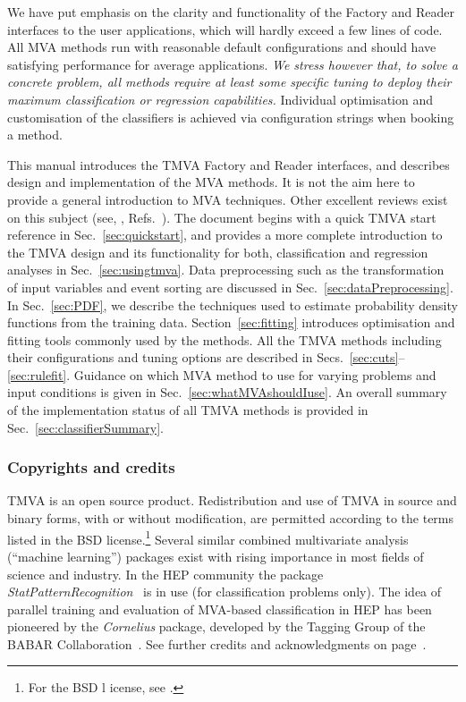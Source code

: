 We have put emphasis on the clarity and functionality of the Factory and Reader interfaces 
to the user applications, which will hardly exceed a few lines of code. All MVA methods
run with reasonable default configurations and should have satisfying performance for 
average applications. {\em We stress however that, to solve a concrete problem, all 
methods require at least some specific tuning to deploy their maximum classification or 
regression capabilities.} Individual optimisation and customisation of the classifiers is 
achieved via configuration strings when booking a method.

This manual introduces the TMVA Factory and Reader interfaces, and describes design and 
implementation of the MVA methods. It is not the aim here to provide a general introduction 
to MVA techniques. Other excellent reviews exist on this subject (see, \eg, 
Refs.~\cite{FriedmanBook,WebbBook,KunchevaBook}). The document begins with a quick TMVA 
start reference in Sec.~\ref{sec:quickstart}, and provides a more complete introduction 
to the TMVA design and its functionality for both, classification and regression analyses
in Sec.~\ref{sec:usingtmva}. Data preprocessing such as the transformation of input variables 
and event sorting are discussed in Sec.~\ref{sec:dataPreprocessing}. In Sec.~\ref{sec:PDF}, 
we describe the techniques used to estimate probability density functions from the training
data. Section~\ref{sec:fitting} introduces optimisation and fitting tools commonly used by 
the methods. All the TMVA methods including their configurations and tuning options are 
described in Secs.~\ref{sec:cuts}--\ref{sec:rulefit}. Guidance on which MVA method to use 
for varying problems and input conditions is given in Sec.~\ref{sec:whatMVAshouldIuse}. 
An overall summary of the implementation status of all TMVA methods is provided in 
Sec.~\ref{sec:classifierSummary}.

\subsubsection*{Copyrights and credits}

\begin{details}
TMVA is an open source product. Redistribution and use of TMVA in source and binary forms, 
with or without modification, are permitted according to the terms listed in the 
BSD license.\footnote
{
  For the BSD l
icense, see . 
}
Several similar combined multivariate analysis (``machine learning'') packages exist 
with rising importance in most fields of science and industry. In the HEP
community the package {\em StatPatternRecognition}~\cite{narsky,MVAreferences} 
is in use (for classification problems only). The idea of parallel training and 
evaluation of MVA-based classification in HEP has been pioneered by the {\em Cornelius} 
package, developed by the Tagging Group of the BABAR Collaboration~\cite{Cornelius}. 
See further credits and acknowledgments on page~\pageref{sec:Acknowledgments}.
\end{details}

\vfill
\pagebreak
